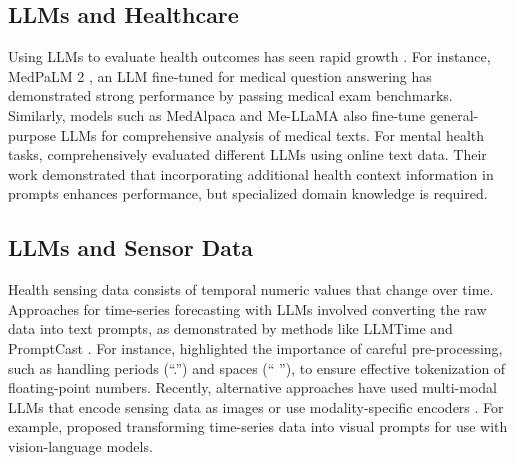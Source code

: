 \subsection{LLMs and Healthcare}
Using LLMs to evaluate health outcomes has seen rapid growth \citep{he2023survey, han2023medalpaca, liu2025generalist, singhal2025toward}. For instance, MedPaLM 2 \citep{singhal2025toward}, an LLM fine-tuned for medical question answering has demonstrated strong performance by passing medical exam benchmarks. Similarly, models such as MedAlpaca \citep{han2023medalpaca} and Me-LLaMA \citep{xie2024me} also fine-tune general-purpose LLMs for comprehensive analysis of medical texts. For mental health tasks, \citet{xu2024mental} comprehensively evaluated different LLMs using online text data. Their work demonstrated that incorporating additional health context information in prompts enhances performance, but specialized domain knowledge is required.

\subsection{LLMs and Sensor Data}

Health sensing data consists of temporal numeric values that change over time. Approaches for time-series forecasting with LLMs involved converting the raw data into text prompts, as demonstrated by methods like LLMTime \citep{gruver2024large} and PromptCast \citep{xue2023promptcast}. For instance, \citet{gruver2024large} highlighted the importance of careful pre-processing, such as handling periods (“.”) and spaces (“ ”), to ensure effective tokenization of floating-point numbers.  Recently, alternative approaches have used multi-modal LLMs that encode sensing data as images \cite{yoon2024my} or use modality-specific encoders \cite{belyaeva2023multimodal}. For example, \citet{yoon2024my} proposed transforming time-series data into visual prompts for use with vision-language models. 


